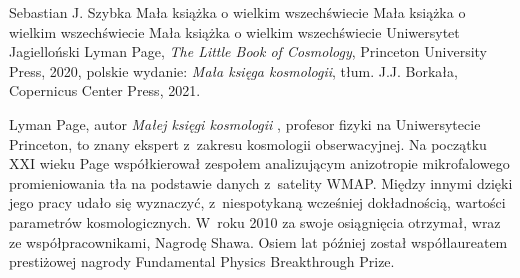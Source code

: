\begin{newrevplenv}{Sebastian J. Szybka}
	{Mała książka o wielkim wszechświecie}
	{Mała książka o wielkim wszechświecie}
	{Mała książka o wielkim wszechświecie}
	{Uniwersytet Jagielloński}
	{Lyman Page, \textit{The Little Book of Cosmology}, Princeton University Press, 2020, polskie wydanie: \textit{Mała księga kosmologii}, tłum. J.J. Borkała, Copernicus Center Press, 2021.}


\lettrine[loversize=0.13,lines=2,lraise=-0.03,nindent=0em,findent=0.2pt]%
{L}{}yman Page, autor \textit{Małej księgi kosmologii}
\parencite[][]{page_little_2020}, %
 profesor fizyki na Uniwersytecie Princeton, to znany ekspert z~zakresu kosmologii obserwacyjnej. Na początku XXI wieku Page współkierował zespołem analizującym anizotropie mikrofalowego promieniowania tła na podstawie danych z~satelity WMAP. Między innymi dzięki jego pracy udało się wyznaczyć, z~niespotykaną wcześniej dokładnością, wartości parametrów kosmologicznych. W~roku 2010 za swoje osiągnięcia otrzymał, wraz ze współpracownikami, Nagrodę Shawa. Osiem lat później został współlaureatem prestiżowej nagrody Fundamental Physics Breakthrough Prize.


\end{newrevplenv}
